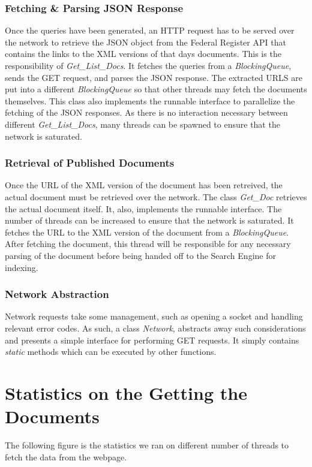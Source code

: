 \documentclass{sig-alternate-05-2015}
\begin{document}
\subsubsection{Fetching \& Parsing JSON Response}
Once the queries have been generated, an HTTP request has to be served over the network to retrieve the JSON object from the Federal Register API that contains the links to the XML versions of that days documents. This is the responsibility of \emph{Get\_List\_Docs}. It fetches the queries from a \emph{BlockingQueue}, sends the GET request, and parses the JSON response. The extracted URLS are put into a different \emph{BlockingQueue} so that other threads may fetch the documents themselves. This class also implements the runnable interface to parallelize the fetching of the JSON responses. As there is no interaction necessary between different \emph{Get\_List\_Docs}, many threads can be spawned to ensure that the network is saturated.

\subsubsection{Retrieval of Published Documents}
Once the URL of the XML version of the document has been retreived, the actual document must be retrieved over the network. The class \emph{Get\_Doc} retrieves the actual document itself. It, also, implements the runnable interface. The number of threads can be increased to ensure that the network is saturated. It fetches the URL to the XML version of the document from a \emph{BlockingQueue}. After fetching the document, this thread will be responsible for any necessary parsing of the document before being handed off to the Search Engine for indexing.

\subsubsection{Network Abstraction}
Network requests take some management, such as opening a socket and handling relevant error codes. As such, a class \emph{Network}, abstracts away such considerations and presents a simple interface for performing GET requests. It simply contains \emph{static} methods which can be executed by other functions. 

\section{Statistics on the Getting the Documents}
The following figure is the statistics we ran on different number of threads to fetch the data from the webpage.\\
\end{document}
